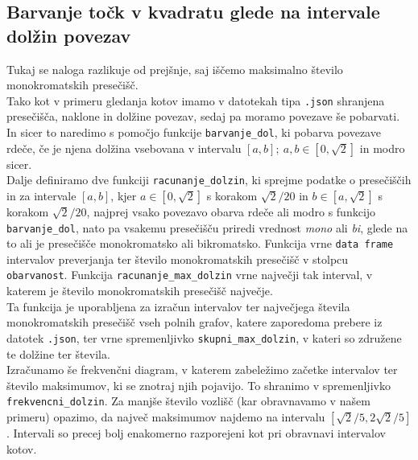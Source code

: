 \documentclass[12pt, a4paper]{article}
\begin{document}
	\subsection{Barvanje točk v kvadratu glede na intervale dolžin povezav}
	Tukaj se naloga razlikuje od prejšnje, saj iščemo maksimalno število monokromatskih presečišč. \\
	Tako kot v primeru gledanja kotov imamo v datotekah tipa \texttt{.json} shranjena presečišča, naklone in dolžine povezav, sedaj pa moramo povezave še pobarvati. In sicer to naredimo s pomočjo funkcije \texttt{barvanje\_dol}, ki pobarva povezave rdeče, če je njena dolžina vsebovana v intervalu $\left[{a,b}\right]; \ a,b \in \left[{0,\sqrt{2}}\right]$ in modro sicer. \\
	Dalje definiramo dve funkciji \texttt{racunanje\_dolzin}, ki sprejme podatke o presečiščih in za intervale $\left[{a,b}\right]$, kjer $a \in \left[{0, \sqrt{2}}\right]$ s korakom $\sqrt{2}/20$ in $b \in \left[{a, \sqrt{2}}\right]$ s korakom $\sqrt{2}/20$, najprej vsako povezavo obarva rdeče ali modro s funkcijo \texttt{barvanje\_dol}, nato pa vsakemu presečišču priredi vrednost \textit{mono} ali \textit{bi}, glede na to ali je presečišče monokromatsko ali bikromatsko. Funkcija vrne \texttt{data frame} intervalov preverjanja ter število monokromatskih presečišč v stolpcu \texttt{obarvanost}. Funkcija \texttt{racunanje\_max\_dolzin} vrne največji tak interval, v katerem je število monokromatskih presečišč največje. \\
	Ta funkcija je uporabljena za izračun intervalov ter največjega števila monokromatskih presečišč vseh polnih grafov, katere zaporedoma prebere iz datotek \texttt{.json}, ter vrne spremenljivko \texttt{skupni\_max\_dolzin}, v kateri so združene te dolžine ter števila. \\
	Izračunamo še frekvenčni diagram, v katerem zabeležimo začetke intervalov ter število maksimumov, ki se znotraj njih pojavijo. To shranimo v spremenljivko \texttt{frekvencni\_dolzin}. Za manjše število vozlišč (kar obravnavamo v našem primeru) opazimo, da največ maksimumov najdemo na intervalu $\left[{\sqrt{2}/5, 2\sqrt{2}/5}\right]$. Intervali so precej bolj enakomerno razporejeni kot pri obravnavi intervalov kotov.
\end{document}
